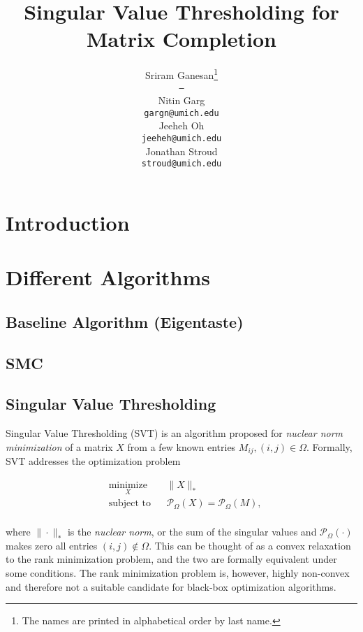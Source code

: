 \documentclass{article} %
\title{Singular Value Thresholding for Matrix Completion}
\author{
Sriram Ganesan\thanks{ The names are printed in alphabetical order by last name.} \\
\texttt{---} \\
\And
Nitin Garg \\
\texttt{gargn@umich.edu} \\
\AND
Jeeheh Oh \\
\texttt{jeeheh@umich.edu} \\
\And
Jonathan Stroud \\
\texttt{stroud@umich.edu} \\
}
\begin{document}
\maketitle

\begin{abstract}

\end{abstract}

\section{Introduction}

\section{Different Algorithms}

\subsection{Baseline Algorithm (Eigentaste)}

\subsection{SMC}

\subsection{Singular Value Thresholding}

Singular Value Thresholding (SVT) \cite{cai2010singular} is an
algorithm proposed for \emph{nuclear norm minimization} of a matrix
$X$ from a few known entries $M_{ij}, (i,j) \in \Omega$. Formally, SVT
addresses the optimization problem

\begin{equation*}
\begin{aligned}
  & \underset{X}{\text{minimize}} & & \|X\|_{*} \\
  & \text{subject to}             & & \mathcal{P}_\Omega (X) =
  \mathcal{P}_\Omega (M), \\
\end{aligned}
\end{equation*}

where $\|\cdot\|_{*}$ is the \emph{nuclear norm}, or the sum of the
singular values and $\mathcal{P}_\Omega (\cdot)$ makes zero all
entries $(i, j) \notin \Omega$. This can be thought of as a convex
relaxation to the rank minimization problem, and the two are formally
equivalent under some conditions. The rank minimization problem is,
however, highly non-convex and therefore not a suitable candidate for
black-box optimization algorithms.
\end{document}
